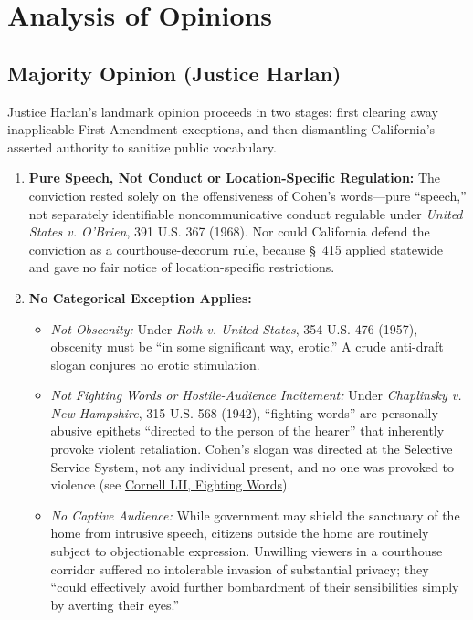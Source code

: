\documentclass[12pt]{article}
\begin{document}
\section{Analysis of Opinions}
\subsection{Majority Opinion (Justice Harlan)}

Justice Harlan's landmark opinion proceeds in two stages: first clearing away inapplicable First Amendment exceptions, and then dismantling California's asserted authority to sanitize public vocabulary.

\begin{enumerate}
  \item \textbf{Pure Speech, Not Conduct or Location-Specific Regulation:} The conviction rested solely on the offensiveness of Cohen's words---pure ``speech,'' not separately identifiable noncommunicative conduct regulable under \textit{United States v. O'Brien}, 391 U.S. 367 (1968). Nor could California defend the conviction as a courthouse-decorum rule, because \S~415 applied statewide and gave no fair notice of location-specific restrictions.
  \item \textbf{No Categorical Exception Applies:}
  \begin{itemize}
    \item \textit{Not Obscenity:} Under \textit{Roth v. United States}, 354 U.S. 476 (1957), obscenity must be ``in some significant way, erotic.'' A crude anti-draft slogan conjures no erotic stimulation.
    \item \textit{Not Fighting Words or Hostile-Audience Incitement:} Under \textit{Chaplinsky v. New Hampshire}, 315 U.S. 568 (1942), ``fighting words'' are personally abusive epithets ``directed to the person of the hearer'' that inherently provoke violent retaliation. Cohen's slogan was directed at the Selective Service System, not any individual present, and no one was provoked to violence (see \href{https://www.law.cornell.edu/constitution-conan/amendment-1/fighting-words}{Cornell LII, Fighting Words}).
    \item \textit{No Captive Audience:} While government may shield the sanctuary of the home from intrusive speech, citizens outside the home are routinely subject to objectionable expression. Unwilling viewers in a courthouse corridor suffered no intolerable invasion of substantial privacy; they ``could effectively avoid further bombardment of their sensibilities simply by averting their eyes.''

\end{itemize}
\end{enumerate}
\end{document}
